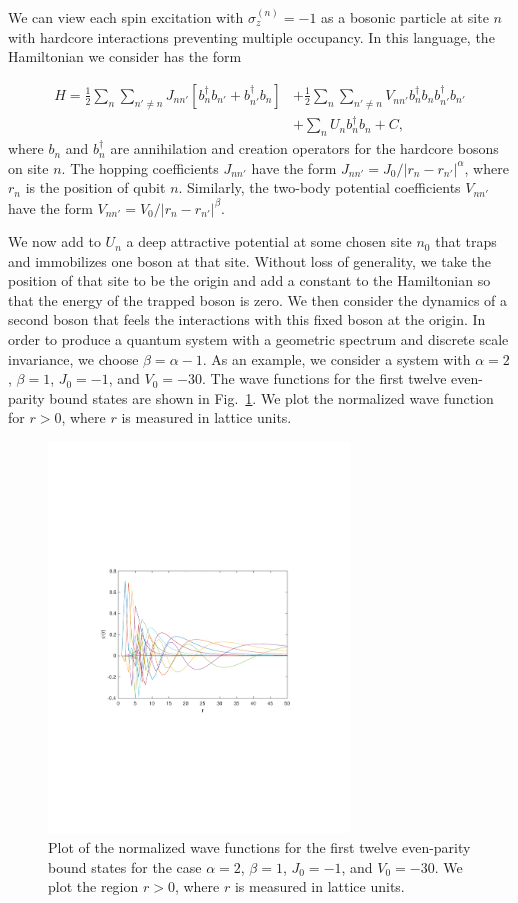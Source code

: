 \documentclass[10pt]{article}
\begin{document}
We can view each spin excitation with $\sigma_z^{(n)}=-1$ as a bosonic
particle at site $n$ with hardcore interactions preventing multiple
occupancy.  In this language, the Hamiltonian we consider has the form

\begin{align}
H =\frac{1}{2} \sum_{n}\sum_{n'\ne n} J_{nn'}[b^{\dagger}_n b_{n'} +b^{\dagger}_{n'}
b_n] & + \frac{1}{2}\sum_{n}\sum_{n' \ne n}V^{}_{nn'}b^{\dagger}_n b_n b^{\dagger}_{n'}
b_{n'} \nonumber\\
& + \sum_{n}U^{}_{n}b^{\dagger}_n b_n+C, \label{time_fractal}
\end{align}
where $b_n$ and $b^{\dagger}_n$ are annihilation and creation
operators for the hardcore bosons on site $n$.  The hopping
coefficients $J_{nn'}$ have the form $J_{nn'} =
J_0/|r_n-r_{n'}|^{\alpha}$, where $r_n$ is the position of qubit $n$.
Similarly, the two-body potential coefficients $V_{nn'}$ have the form
$V_{nn'} = V_0/|r_n-r_{n'}|^{\beta}$.

We now add to $U_n$ a deep attractive potential at some chosen site
$n_0$ that traps and immobilizes one boson at that site.  Without loss
of generality, we take the position of that site to be the origin and
add a constant to the Hamiltonian so that the energy of the trapped
boson is zero.  We then consider the dynamics of a second boson that
feels the interactions with this fixed boson at the origin.  In order
to produce a quantum system with a geometric spectrum and discrete
scale invariance, we choose $\beta=\alpha-1$. As an example, we
consider a system with $\alpha = 2$, $\beta = 1$, $J_0 = -1$, and $V_0= -30$.  
The wave functions for the first twelve even-parity bound
states are shown in Fig.~\ref{even_wavefunctions}.  We plot the
normalized wave function for $r>0$, where $r$ is measured in lattice
units.
     

\begin{figure}
\centering
\includegraphics[width=8cm]{v30_even_wavefunctions}
\caption{Plot of the normalized wave functions
for the first twelve even-parity bound states for the case $\alpha =
2$, $\beta = 1$, $J_0 = -1$, and $V_0 = -30$.  We plot the region
$r>0$, where $r$ is measured in lattice units.}
\label{even_wavefunctions}
\end{figure}
\end{document}
